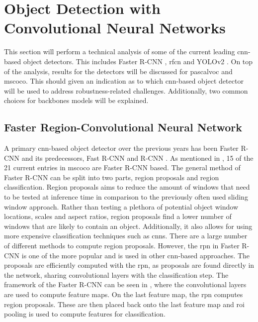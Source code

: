 \section{Object Detection with Convolutional Neural Networks}\label{sec:objdet}
This section will perform a technical analysis of some of the current leading \gls{cnn}-based object detectors. This includes Faster R-CNN \cite{fasterrcnn}, \gls{rfcn} \cite{rfcn} and YOLOv2 \cite{yolov2}. On top of the analysis, results for the detectors will be discussed for \gls{pascalvoc} and \gls{mscoco}. This should given an indication as to which \gls{cnn}-based object detector will be used to address robustness-related challenges. Additionally, two common choices for backbones models will be explained.

\subsection{Faster Region-Convolutional Neural Network}
A primary \gls{cnn}-based object detector over the previous years has been Faster R-CNN \cite{fasterrcnn} and its predecessors, Fast R-CNN \cite{fastrcnn} and R-CNN \cite{rcnn}. As mentioned in , 15 of the 21 current entries in \gls{mscoco} are Faster R-CNN based. The general method of Faster R-CNN can be split into two parts, region proposals and region classification. Region proposals aims to reduce the amount of windows that need to be tested at inference time in comparison to the previously often used sliding window approach. Rather than testing a plethora of potential object window locations, scales and aspect ratios, region proposals find a lower number of windows that are likely to contain an object. Additionally, it also allows for using more expensive classification techniques such as \glspl{cnn}. There are a large number of different methods to compute region proposals. However, the \gls{rpn} in Faster R-CNN is one of the more popular and is used in other \gls{cnn}-based approaches. The proposals are efficiently computed with the \gls{rpn}, as proposals are found directly in the network, sharing convolutional layers with the classification step. The framework of the Faster R-CNN can be seen in , where the convolutional layers are used to compute feature maps. On the last feature map, the \gls{rpn} computes region proposals. These are then placed back onto the last feature map and \gls{roi} pooling is used to compute features for classification.

